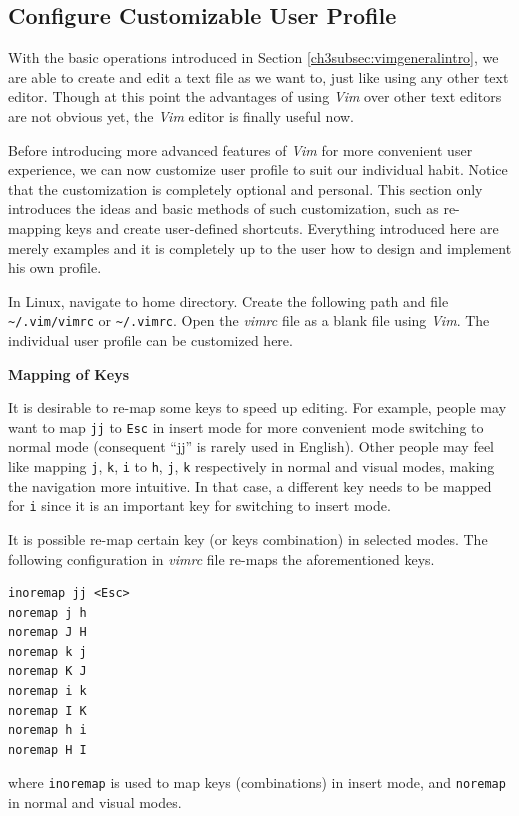 \subsection{Configure Customizable User Profile}

With the basic operations introduced in Section \ref{ch3subsec:vimgeneralintro}, we are able to create and edit a text file as we want to, just like using any other text editor. Though at this point the advantages of using \textit{Vim} over other text editors are not obvious yet, the \textit{Vim} editor is finally useful now.

Before introducing more advanced features of \textit{Vim} for more convenient user experience, we can now customize user profile to suit our individual habit. Notice that the customization is completely optional and personal. This section only introduces the ideas and basic methods of such customization, such as re-mapping keys and create user-defined shortcuts. Everything introduced here are merely examples and it is completely up to the user how to design and implement his own profile.

In Linux, navigate to home directory. Create the following path and file \verb|~/.vim/vimrc| or \verb|~/.vimrc|. Open the \textit{vimrc} file as a blank file using \textit{Vim}. The individual user profile can be customized here.

\vspace{0.1in}
\noindent \textbf{Mapping of Keys}
\vspace{0.1in}

It is desirable to re-map some keys to speed up editing. For example, people may want to map \verb|jj| to \verb|Esc| in insert mode for more convenient mode switching to normal mode (consequent ``jj'' is rarely used in English). Other people may feel like mapping \verb|j|, \verb|k|, \verb|i| to \verb|h|, \verb|j|, \verb|k| respectively in normal and visual modes, making the navigation more intuitive. In that case, a different key needs to be mapped for \verb|i| since it is an important key for switching to insert mode.

It is possible re-map certain key (or keys combination) in selected modes. The following configuration in \textit{vimrc} file re-maps the aforementioned keys.
\begin{verbatim}
inoremap jj <Esc>
noremap j h
noremap J H
noremap k j
noremap K J
noremap i k
noremap I K
noremap h i
noremap H I
\end{verbatim}
where \verb|inoremap| is used to map keys (combinations) in insert mode, and \verb|noremap| in normal and visual modes.

